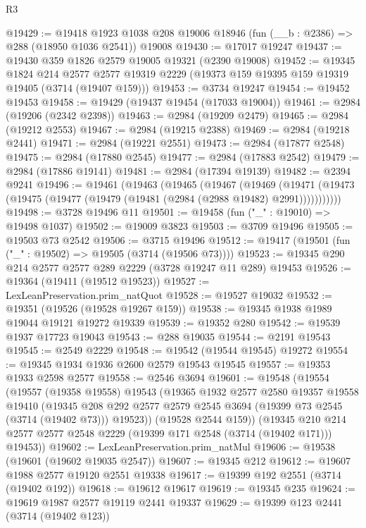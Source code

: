 \begin{lexlean}{R3}
\begin{coremodule}
@19429 := @19418
    @1923
    @1038
    @208
    @19006
    @18946
    (fun (__b : @2386) => @288 (@18950 @1036 @2541))
    @19008
@19430 := @17017 @19247
@19437 := @19430 @359 @1826 @2579 @19005 @19321 (@2390 @19008)
@19452 := @19345
    @1824
    @214
    @2577
    @2577
    @19319
    @2229
    (@19373 @159 @19395 @159 @19319 @19405 (@3714 (@19407 @159)))
@19453 := @3734 @19247
@19454 := @19452 @19453
@19458 := @19429 (@19437 @19454 (@17033 @19004))
@19461 := @2984 (@19206 (@2342 @2398))
@19463 := @2984 (@19209 @2479)
@19465 := @2984 (@19212 @2553)
@19467 := @2984 (@19215 @2388)
@19469 := @2984 (@19218 @2441)
@19471 := @2984 (@19221 @2551)
@19473 := @2984 (@17877 @2548)
@19475 := @2984 (@17880 @2545)
@19477 := @2984 (@17883 @2542)
@19479 := @2984 (@17886 @19141)
@19481 := @2984 (@17394 @19139)
@19482 := @2394 @9241
@19496 := @19461
    (@19463
      (@19465
        (@19467
          (@19469
            (@19471 (@19473 (@19475 (@19477 (@19479 (@19481 (@2984 (@2988 @19482) @2991)))))))))))
@19498 := @3728 @19496 @11
@19501 := @19458 (fun ("_" : @19010) => @19498 @1037)
@19502 := @19009 @3823
@19503 := @3709 @19496
@19505 := @19503 @73 @2542
@19506 := @3715 @19496
@19512 := @19417 (@19501 (fun ("_" : @19502) => @19505 (@3714 (@19506 @73))))
@19523 := @19345 @290 @214 @2577 @2577 @289 @2229 (@3728 @19247 @11 @289) @19453
@19526 := @19364 (@19411 (@19512 @19523))
@19527 := LexLeanPreservation.prim_natQuot
@19528 := @19527 @19032
@19532 := @19351 (@19526 (@19528 @19267 @159))
@19538 := @19345 @1938 @1989 @19044 @19121 @19272 @19339
@19539 := @19352 @280
@19542 := @19539 @1937 @17723 @19043
@19543 := @288 @19035
@19544 := @2191 @19543
@19545 := @2549 @2229
@19548 := @19542 (@19544 @19545) @19272
@19554 := @19345 @1934 @1936 @2600 @2579 @19543 @19545
@19557 := @19353 @1933 @2598 @2577
@19558 := @2546 @3694
@19601 := @19548
    (@19554
      (@19557
        (@19358 @19558)
        @19543
        (@19365
          @1932
          @2577
          @2580
          @19357
          @19558
          @19410
          (@19345 @208 @292 @2577 @2579 @2545 @3694 (@19399 @73 @2545 (@3714 (@19402 @73))) @19523))
        (@19528 @2544 @159))
      (@19345 @210 @214 @2577 @2577 @2548 @2229 (@19399 @171 @2548 (@3714 (@19402 @171))) @19453))
@19602 := LexLeanPreservation.prim_natMul
@19606 := @19538 (@19601 (@19602 @19035 @2547))
@19607 := @19345 @212
@19612 := @19607 @1988 @2577 @19120 @2551 @19338
@19617 := @19399 @192 @2551 (@3714 (@19402 @192))
@19618 := @19612 @19617
@19619 := @19345 @235
@19624 := @19619 @1987 @2577 @19119 @2441 @19337
@19629 := @19399 @123 @2441 (@3714 (@19402 @123))

\end{coremodule}
\end{lexlean}
